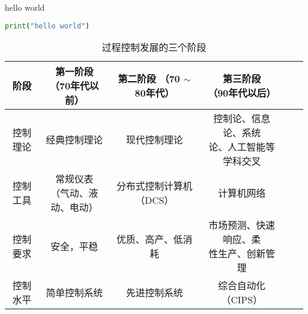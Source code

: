\documentclass[UTF8]{article}
\begin{document}
hello world\cite{MOTO201811002}

\begin{lstlisting}[language=Python]
print("hello world")
\end{lstlisting}




\begin{table}[H] %
\centering %
\begin{tabular}{cccccc} %
    \toprule %
    阶段 & \makecell{第一阶段\\（70年代以前）} & \makecell{第二阶段\\（70 $\sim$ 80年代）} & \makecell{第三阶段\\（90年代以后）} \\
    \midrule %
    控制理论 & 经典控制理论 & 现代控制理论 & \makecell{控制论、信息论、系统\\论、人工智能等学科交叉} \\
    控制工具 & \makecell{常规仪表\\（气动、液动、电动）} & 分布式控制计算机（DCS） & 计算机网络 \\
    控制要求 & 安全，平稳 & 优质、高产、低消耗 & \makecell{市场预测、快速响应、柔\\性生产、创新管理} \\
    控制水平 & 简单控制系统 & 先进控制系统 & 综合自动化（CIPS） \\
    \bottomrule %
\end{tabular}
\caption{过程控制发展的三个阶段} %
\end{table}
\end{document}
